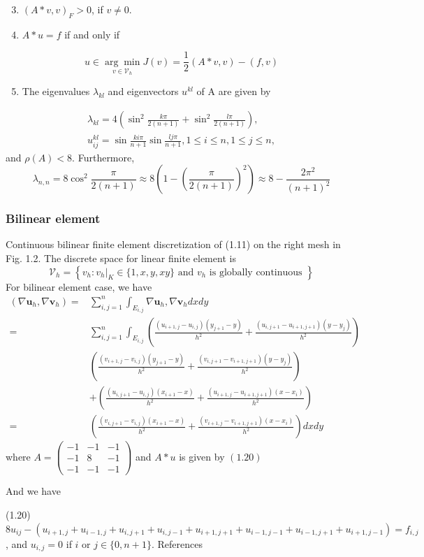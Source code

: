 \documentclass[10pt]{article}
\begin{document}
    \begin{enumerate}
      \setcounter{enumiii}{2}
      \item $(A * v, v)_{F}>0$, if $v \neq 0$.

      \item $A * u=f$ if and only if

    \end{enumerate}
$$
u \in \underset{v \in \mathcal{V}_{h}}{\arg \min } J(v)=\frac{1}{2}(A * v, v)-(f, v)
$$

    \begin{enumerate}
      \setcounter{enumiii}{4}
      \item The eigenvalues $\lambda_{k l}$ and eigenvectors $u^{k l}$ of A are given by
    \end{enumerate}
$$
\begin{gathered}
\lambda_{k l}=4\left(\sin ^{2} \frac{k \pi}{2(n+1)}+\sin ^{2} \frac{l \pi}{2(n+1)}\right), \\
u_{i j}^{k l}=\sin \frac{k i \pi}{n+1} \sin \frac{l j \pi}{n+1}, 1 \leq i \leq n, 1 \leq j \leq n,
\end{gathered}
$$
and $\rho(A)<8 .$ Furthermore,
$$
\lambda_{n, n}=8 \cos ^{2} \frac{\pi}{2(n+1)} \approx 8\left(1-\left(\frac{\pi}{2(n+1)}\right)^{2}\right) \approx 8-\frac{2 \pi^{2}}{(n+1)^{2}}
$$

\subsubsection{Bilinear element}
Continuous bilinear finite element discretization of (1.11) on the right mesh in Fig. 1.2. The discrete space for linear finite element is
$$
\mathcal{V}_{h}=\left\{v_{h}:\left.v_{h}\right|_{K} \in\{1, x, y, x y\} \text { and } v_{h} \text { is globally continuous }\right\}
$$
For bilinear element case, we have
$$
\begin{aligned}
\left(\nabla \mathbf{u}_{h}, \nabla \mathbf{v}_{h}\right)=& \sum_{i, j=1}^{n} \int_{E_{i, j}} \nabla \mathbf{u}_{h}, \nabla \mathbf{v}_{h} d x d y \\
=& \sum_{i, j=1}^{n} \int_{E_{i, j}}\left(\frac{\left(u_{i+1, j}-u_{i, j}\right)\left(y_{j+1}-y\right)}{h^{2}}+\frac{\left(u_{i, j+1}-u_{i+1, j+1}\right)\left(y-y_{j}\right)}{h^{2}}\right) \\
&\left(\frac{\left(v_{i+1, j}-v_{i, j}\right)\left(y_{j+1}-y\right)}{h^{2}}+\frac{\left(v_{i, j+1}-v_{i+1, j+1}\right)\left(y-y_{j}\right)}{h^{2}}\right) \\
&+\left(\frac{\left(u_{i, j+1}-u_{i, j}\right)\left(x_{i+1}-x\right)}{h^{2}}+\frac{\left(u_{i+1, j}-u_{i+1, j+1}\right)\left(x-x_{i}\right)}{h^{2}}\right) \\
=&\left(\frac{\left(v_{i, j+1}-v_{i, j}\right)\left(x_{i+1}-x\right)}{h^{2}}+\frac{\left(v_{i+1, j}-v_{i+1, j+1}\right)\left(x-x_{i}\right)}{h^{2}}\right) d x d y
\end{aligned}
$$
where $A=\left(\begin{array}{ccc}-1 & -1 & -1 \\ -1 & 8 & -1 \\ -1 & -1 & -1\end{array}\right)$ and $A * u$ is given by $(1.20)$

And we have

(1.20) $8 u_{i j}-\left(u_{i+1, j}+u_{i-1, j}+u_{i, j+1}+u_{i, j-1}+u_{i+1, j+1}+u_{i-1, j-1}+u_{i-1, j+1}+u_{i+1, j-1}\right)=f_{i, j}$, and $u_{i, j}=0$ if $i$ or $j \in\{0, n+1\} .$ References
\end{document}

